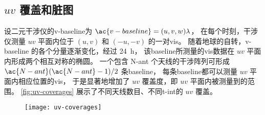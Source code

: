 \subsection{\texorpdfstring{$uv$}{uv} 覆盖和脏图}
\label{sec:uv-coverage}

设二元干涉仪的\acl{v-baseline}为 $\ac{v-baseline} = (u,v,w)\lambda$，
在每个时刻，干涉仪测量 $uv$ 平面内位于 $(u,v)$ 和 $(-u,-v)$ 的一对\ac{vis}。
随着地球的自转，\ac{v-baseline} 的各个分量逐渐变化，经过 \SI{24}{\hour}，
该\ac{baseline}所测量的\ac{vis}数据在 $uv$ 平面内形成两个相互对称的椭圆。
一个包含 \ac{N-ant} 个天线的干涉阵列可形成
$\ac{N-ant}(\ac{N-ant}-1)/2$ 条\ac{baseline}，
每条\ac{baseline}都可以测量 $uv$ 平面内相应位置的\ac{vis}，
于是显著地增加了 $uv$ 覆盖度，即 $uv$ 平面内被测量到的范围。
\autoref{fig:uv-coverages} 展示了不同天线数目、不同\ac{t-int}的 $uv$ 覆盖。

\begin{figure}[htp]
  \centering
  \texttt{[image: uv-coverages]}
  \label{fig:uv-coverages}
\end{figure}

